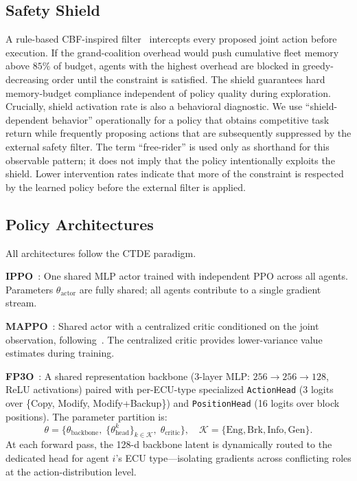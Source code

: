 \documentclass[conference]{IEEEtran}
\begin{document}
\subsection{Safety Shield}

A rule-based CBF-inspired filter~\cite{ames2019cbf,alshiekh2018shielding} intercepts
every proposed joint action before execution. If the grand-coalition overhead would
push cumulative fleet memory above $85\%$ of budget, agents with the highest overhead
are blocked in greedy-decreasing order until the constraint is satisfied. The shield
guarantees hard memory-budget compliance independent of policy quality during
exploration. Crucially, shield activation rate is also a behavioral diagnostic. We use ``shield-dependent
behavior'' operationally for a policy that obtains competitive task return while frequently
proposing actions that are subsequently suppressed by the external safety filter. The term
``free-rider'' is used only as shorthand for this observable pattern; it does not imply that
the policy intentionally exploits the shield. Lower intervention rates indicate that more of
the constraint is respected by the learned policy before the external filter is applied.

\subsection{Policy Architectures}
\label{sec:archs}

All architectures follow the CTDE paradigm.

\textbf{IPPO}~\cite{b3}: One shared MLP actor trained with independent PPO across all
agents. Parameters $\theta_{\text{actor}}$ are fully shared; all agents contribute to
a single gradient stream.

\textbf{MAPPO}~\cite{b3}: Shared actor with a centralized critic conditioned on the
joint observation, following~\cite{b10}. The centralized critic provides lower-variance
value estimates during training.

\textbf{FP3O}~\cite{b2}: A shared representation backbone (3-layer MLP:
$256\to256\to128$, ReLU activations) paired with per-ECU-type specialized
\texttt{ActionHead} (3 logits over \{Copy, Modify, Modify+Backup\}) and
\texttt{PositionHead} (16 logits over block positions). The parameter partition is:
\[
  \theta = \bigl\{\theta_{\text{backbone}},\;
                  \{\theta_{\text{head}}^k\}_{k \in \mathcal{K}},\;
                  \theta_{\text{critic}}\bigr\},\quad
  \mathcal{K} = \{\text{Eng}, \text{Brk}, \text{Info}, \text{Gen}\}.
\]
At each forward pass, the 128-d backbone latent is dynamically routed to the
dedicated head for agent $i$'s ECU type---isolating gradients across conflicting
roles at the action-distribution level.
\end{document}

